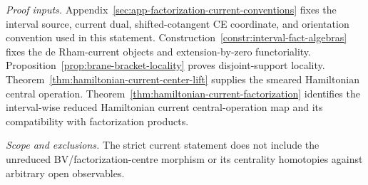 \begin{stmt}
  \emph{Proof inputs.}
  Appendix~\ref{sec:app-factorization-current-conventions} fixes the
  interval source, current dual, shifted-cotangent CE coordinate, and
  orientation convention used in this statement.
  Construction~\ref{constr:interval-fact-algebras} fixes the de
  Rham-current objects and extension-by-zero functoriality.
  Proposition~\ref{prop:brane-bracket-locality} proves disjoint-support
  locality.  Theorem~\ref{thm:hamiltonian-current-center-lift} supplies
  the smeared Hamiltonian central operation.  Theorem~\ref{thm:hamiltonian-current-factorization}
  identifies the interval-wise reduced Hamiltonian current
  central-operation map and its
  compatibility with factorization products.

  \emph{Scope and exclusions.} The strict current statement does not include the
  unreduced BV/factorization-centre morphism or its centrality homotopies
  against arbitrary open observables.
\end{stmt}

